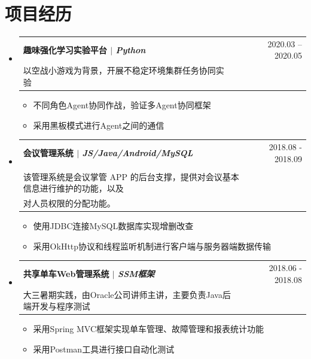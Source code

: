 \documentclass[a4paper,11pt]{ctexart}
\makeatletter
\newcommand{\CVItem}[1]{
	\item\small{
		{#1 \vspace{-2pt}}
	}
}
\newcommand{\CVSubheading}[4]{
	\vspace{-2pt}\item
	\begin{tabular*}{0.97\textwidth}[t]{l@{\extracolsep{\fill}}r}
		\textbf{#1} & #2 \\
		\small#3 & \small #4 \\
	\end{tabular*}\vspace{-7pt}
}
\newcommand{\CVSubHeadingListStart}{\begin{itemize}[leftmargin=0.5cm, label={}]}
\newcommand{\CVSubHeadingListEnd}{\end{itemize}}
\newcommand{\CVItemListStart}{\begin{itemize}}
\newcommand{\CVItemListEnd}{\end{itemize}\vspace{-5pt}}
\makeatother
\begin{document}
	\section{项目经历}
	\CVSubHeadingListStart
	\CVSubheading
	{{趣味强化学习实验平台}  $|$ \emph{\small{Python}}}{2020.03 -- 2020.05}
	{以空战小游戏为背景，开展不稳定环境集群任务协同实验}{}
	\CVItemListStart
	\CVItem{不同角色Agent协同作战，验证多Agent协同框架}
	\CVItem{采用黑板模式进行Agent之间的通信}
	\CVItemListEnd
	\CVSubheading
	{{会议管理系统}  $|$ \emph{\small{JS/Java/Android/MySQL}}}{2018.08 - 2018.09}
	{\makecell[l]{\hspace{2em}2018年(第6届)中国大学生计算机设计大赛软件服务外包竞赛（移动终端应用）。\\
			该管理系统是会议掌管 APP 的后台支撑，提供对会议基本信息进行维护的功能，以及\\
			对人员权限的分配功能。
	}}{}
	\CVItemListStart
	\CVItem{使用JDBC连接MySQL数据库实现增删改查}
	\CVItem{采用OkHttp协议和线程监听机制进行客户端与服务器端数据传输}
	\CVItemListEnd
	\CVSubheading
	{{共享单车Web管理系统}  $|$ \emph{\small{SSM框架}}}{2018.06 - 2018.08}
	{大三暑期实践，由Oracle公司讲师主讲，主要负责Java后端开发与程序测试}{}
	\CVItemListStart
	\CVItem{采用Spring MVC框架实现单车管理、故障管理和报表统计功能}
	\CVItem{采用Postman工具进行接口自动化测试}
	\CVItemListEnd
	
	\CVSubHeadingListEnd
	

	
\end{document}
